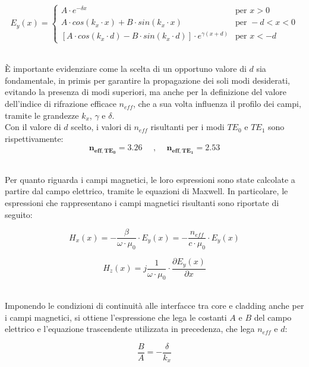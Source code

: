 \begin{equation}
    E_y(x) = \begin{cases}
        A\cdot e^{-\delta x} & \text{per } x > 0 \\
        A\cdot cos(k_x \cdot x) + B \cdot sin(k_x \cdot x) & \text{per } -d < x < 0 \\
        [A\cdot cos(k_x \cdot d) - B \cdot sin(k_x \cdot d)] \cdot e^{\gamma (x+d)} & \text{per } x < -d
    \end{cases}
\end{equation}

\noindent\\ È importante evidenziare come la scelta di un opportuno valore di $d$ sia fondamentale, in primis per garantire la propagazione dei soli modi
desiderati, evitando la presenza di modi superiori, ma anche per la definizione del valore dell'indice di rifrazione efficace $n_{eff}$, che a sua volta
influenza il profilo dei campi, tramite le grandezze $k_x$, $\gamma$ e $\delta$.\\
Con il valore di $d$ scelto, i valori di $n_{eff}$ risultanti per i modi $TE_0$ e $TE_1$ sono rispettivamente:
\[
 \boldsymbol{n_{eff,TE_0} = 3.26} \,\,\,\,\,\,\,\, \text{,} \,\,\,\,\,\,\,\, \boldsymbol{n_{eff,TE_1} = 2.53}
\]

\noindent\\ Per quanto riguarda i campi magnetici, le loro espressioni sono state calcolate a partire dal campo elettrico, tramite le equazioni di Maxwell.
In particolare, le espressioni che rappresentano i campi magnetici risultanti sono riportate di seguito:

\begin{equation}
    H_x(x) = -\frac{\beta}{\omega\cdot \mu_0} \cdot E_y(x) = -\frac{n_{eff}}{c\cdot\mu_0} \cdot E_y(x)
\end{equation}

\begin{equation}
    H_z(x) = j\frac{1}{\omega\cdot \mu_0} \cdot \frac{\partial E_y(x)}{\partial x}
\end{equation}

\noindent\\ Imponendo le condizioni di continuità alle interfacce tra core e cladding anche per i campi magnetici, si ottiene l'espressione che lega le
costanti $A$ e $B$ del campo elettrico e l'equazione trascendente utilizzata in precedenza, che lega $n_{eff}$ e $d$:

\begin{equation}
    \frac{B}{A} = -\frac{\delta}{k_x}
\end{equation}

